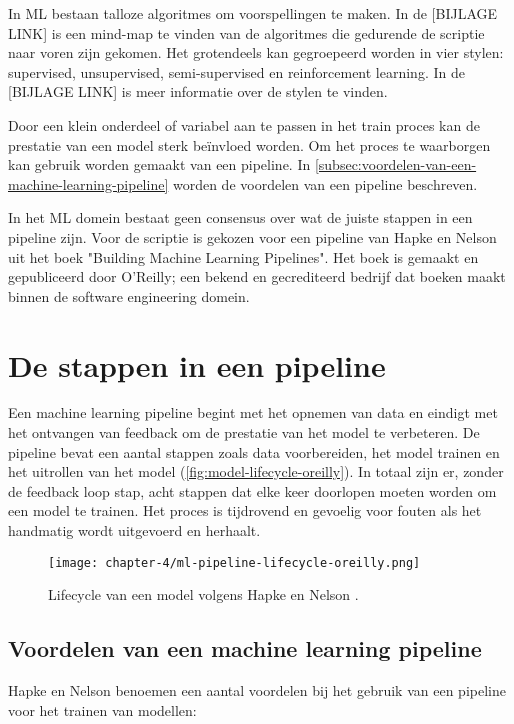 In ML bestaan talloze algoritmes om voorspellingen te maken. In de [BIJLAGE LINK] is een mind-map te vinden van de algoritmes die gedurende de scriptie naar voren zijn gekomen. Het grotendeels kan gegroepeerd worden in vier stylen: supervised, unsupervised, semi-supervised en reinforcement learning. In de [BIJLAGE LINK] is meer informatie over de stylen te vinden.

Door een klein onderdeel of variabel aan te passen in het train proces kan de prestatie van een model sterk beïnvloed worden. Om het proces te waarborgen kan gebruik worden gemaakt van een pipeline. In \autoref{subsec:voordelen-van-een-machine-learning-pipeline} worden de voordelen van een pipeline beschreven.

In het ML domein bestaat geen consensus over wat de juiste stappen in een pipeline zijn. Voor de scriptie is gekozen voor een pipeline van Hapke en Nelson uit het boek "Building Machine Learning Pipelines". Het boek is gemaakt en gepubliceerd door O'Reilly; een bekend en gecrediteerd bedrijf dat boeken maakt binnen de software engineering domein.

\section{De stappen in een pipeline}\label{sec:stappen-in-een-pipeline}
Een machine learning pipeline begint met het opnemen van data en eindigt met het ontvangen van feedback om de prestatie van het model te verbeteren. De pipeline bevat een aantal stappen zoals data voorbereiden, het model trainen en het uitrollen van het model (\autoref{fig:model-lifecycle-oreilly}). In totaal zijn er, zonder de feedback loop stap, acht stappen dat elke keer doorlopen moeten worden om een model te trainen. Het proces is tijdrovend en gevoelig voor fouten als het handmatig wordt uitgevoerd en herhaalt.

\begin{figure}[hbt!]
  \centering
  \texttt{[image: chapter-4/ml-pipeline-lifecycle-oreilly.png]}
  \caption{Lifecycle van een model volgens Hapke en Nelson \cite[p.~4]{building-machine-learning-pipelines-oreilly}.}
  \label{fig:model-lifecycle-oreilly}
\end{figure}

\subsection{Voordelen van een machine learning pipeline}\label{subsec:voordelen-van-een-machine-learning-pipeline}
Hapke en Nelson \cite{building-machine-learning-pipelines-oreilly} benoemen een aantal voordelen bij het gebruik van een pipeline voor het trainen van modellen:

